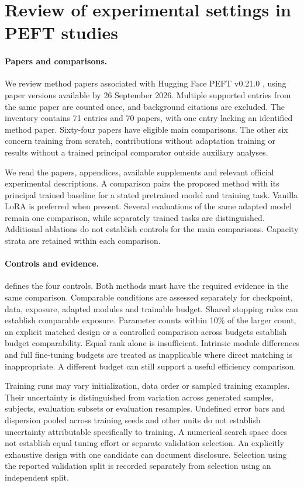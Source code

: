 \section{Review of experimental settings in PEFT studies}\label{app:peft-review}

\paragraph{Papers and comparisons.}
We review method papers associated with Hugging Face PEFT v0.21.0 \citep{mangrulkar2022peft}, using paper versions available by 26 September 2026.
Multiple supported entries from the same paper are counted once, and background citations are excluded.
The inventory contains 71 entries and 70 papers, with one entry lacking an identified method paper.
Sixty-four papers have eligible main comparisons.
The other six concern training from scratch, contributions without adaptation training or results without a trained principal comparator outside auxiliary analyses.

We read the papers, appendices, available supplements and relevant official experimental descriptions.
A comparison pairs the proposed method with its principal trained baseline for a stated pretrained model and training task.
Vanilla LoRA is preferred when present.
Several evaluations of the same adapted model remain one comparison, while separately trained tasks are distinguished.
Additional ablations do not establish controls for the main comparisons.
Capacity strata are retained within each comparison.

\paragraph{Controls and evidence.}
 defines the four controls.
Both methods must have the required evidence in the same comparison.
Comparable conditions are assessed separately for checkpoint, data, exposure, adapted modules and trainable budget.
Shared stopping rules can establish comparable exposure.
Parameter counts within 10\% of the larger count, an explicit matched design or a controlled comparison across budgets establish budget comparability.
Equal rank alone is insufficient.
Intrinsic module differences and full fine-tuning budgets are treated as inapplicable where direct matching is inappropriate.
A different budget can still support a useful efficiency comparison.

Training runs may vary initialization, data order or sampled training examples.
Their uncertainty is distinguished from variation across generated samples, subjects, evaluation subsets or evaluation resamples.
Undefined error bars and dispersion pooled across training seeds and other units do not establish uncertainty attributable specifically to training.
A numerical search space does not establish equal tuning effort or separate validation selection.
An explicitly exhaustive design with one candidate can document disclosure.
Selection using the reported validation split is recorded separately from selection using an independent split.

